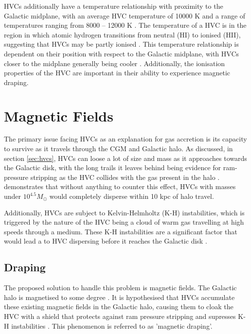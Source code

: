 HVCs additionally have a temperature relationship with proximity to the Galactic midplane, with an average HVC temperature of 10000 K and a range of temperatures ranging from 8000 – 12000 K \citep{ID49, ID48}. The temperature of a HVC is in the region in which atomic hydrogen transitions from neutral (HI) to ionised (HII), suggesting that HVCs may be partly ionised \citep{ID49, ID48, ID68}. This temperature relationship is dependent on their position with respect to the Galactic midplane, with HVCs closer to the midplane generally being cooler \citep{ID48}. Additionally, the ionisation properties of the HVC are important in their ability to experience magnetic draping.

\section{Magnetic Fields}
\label{sec:bfields}

The primary issue facing HVCs as an explanation for gas accretion is its capacity to survive as it travels through the CGM and Galactic halo. As discussed, in section \ref{sec:hvcs}, HVCs can loose a lot of size and mass as it approaches towards the Galactic disk, with the long trails it leaves behind being evidence for ram-pressure stripping as the HVC collides with the gas present in the halo \citep{ID11, ID23, ID33}. \cite{ID25} demonstrates that without anything to counter this effect, HVCs with masses under $10^{4.5} M_{\odot}$ would completely disperse within 10 kpc of halo travel.


Additionally, HVCs are subject to Kelvin-Helmholtz (K-H) instabilities, which is triggered by the nature of the HVC being a cloud of warm gas travelling at high speeds through a medium. These K-H instabilities are a significant factor that would lead a to HVC dispersing before it reaches the Galactic disk \citep{ID11, ID23, ID33}.


\subsection{Draping}
\label{ssec:draping}

The proposed solution to handle this problem is magnetic fields. The Galactic halo is magnetised to some degree \citep{ID30, ID16, ID4, ID42}. It is hypothesised that HVCs accumulate these existing magnetic fields in the Galactic halo, causing them to cloak the HVC with a shield that protects against ram pressure stripping and supresses K-H instabilities \citep{ID10, ID11, ID13, ID23, ID24, ID34}. This phenomenon is referred to as 'magnetic draping'.


